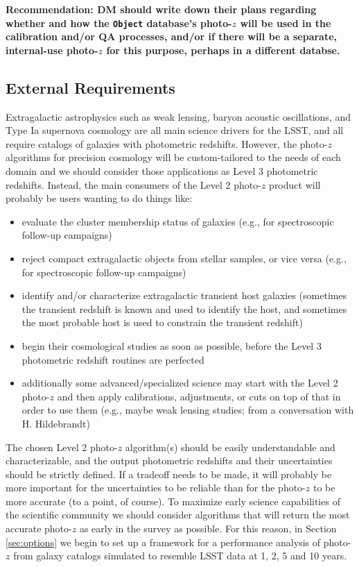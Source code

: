 \documentclass[DM,lsstdraft,toc]{lsstdoc}
\begin{document}
\textbf{Recommendation: DM should write down their plans regarding whether and how the \texttt{Object} database's photo-$z$ will be used in the calibration and/or QA processes, and/or if there will be a separate, internal-use photo-$z$ for this purpose, perhaps in a different databse.}

\subsection{External Requirements}\label{ssec:motivation_external}

Extragalactic astrophysics such as weak lensing, baryon acoustic oscillations, and Type Ia supernova cosmology are all main science drivers for the LSST, and all require catalogs of galaxies with photometric redshifts. However, the photo-$z$ algorithms for precision cosmology will be custom-tailored to the needs of each domain and we should consider those applications as Level 3 photometric redshifts. Instead, the main consumers of the Level 2 photo-$z$ product will probably be users wanting to do things like:
\begin{itemize}
\item evaluate the cluster membership status of galaxies (e.g., for spectroscopic follow-up campaigns)
\item reject compact extragalactic objects from stellar samples, or vice versa (e.g., for spectroscopic follow-up campaigns)
\item identify and/or characterize extragalactic transient host galaxies (sometimes the transient redshift is known and used to identify the host, and sometimes the most probable host is used to constrain the transient redshift)
\item begin their cosmological studies as soon as possible, before the Level 3 photometric redshift routines are perfected
\item additionally some advanced/specialized science may start with the Level 2 photo-$z$ and then apply calibrations, adjustments, or cuts on top of that in order to use them (e.g., maybe weak lensing studies; from a conversation with H. Hildebrandt)
\end{itemize}

\smallskip
The chosen Level 2 photo-$z$ algorithm(s) should be easily understandable and characterizable, and the output photometric redshifts and their uncertainties should be strictly defined. If a tradeoff needs to be made, it will probably be more important for the uncertainties to be reliable than for the photo-$z$ to be more accurate (to a point, of course). To maximize early science capabilities of the scientific community we should consider algorithms that will return the most accurate photo-$z$ as early in the survey as possible. For this reason, in Section \ref{sec:options} we begin to set up a framework for a performance analysis of photo-$z$ from galaxy catalogs simulated to resemble LSST data at 1, 2, 5 and 10 years.
\end{document}

